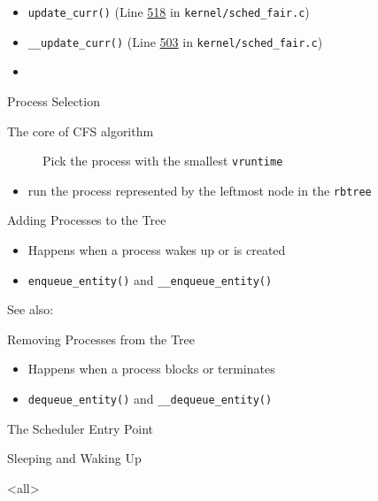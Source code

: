 \begin{itemize}
\item \texttt{update\_curr()} (Line
  \href{http://lxr.linux.no/linux+v2.6.34/kernel/sched\_fair.c\#L518}{518} in
  \texttt{kernel/sched\_fair.c}) 
\item \texttt{\_\_update\_curr()} (Line
  \href{http://lxr.linux.no/linux+v2.6.34/kernel/sched\_fair.c\#L503}{503} in
  \texttt{kernel/sched\_fair.c}) 
\item {}
\end{itemize}

\begin{frame}{Process Selection}
  \begin{description}
  \item[The core of CFS algorithm] Pick the process with the smallest \texttt{vruntime}
  \end{description}
  \begin{itemize}
  \item run the process represented by the leftmost node in the \texttt{rbtree}
  \end{itemize}
  \begin{center}
  \end{center}
\end{frame}

\begin{frame}{Adding Processes to the Tree}
  \begin{itemize}
  \item Happens when a process wakes up or is created
  \item \texttt{enqueue\_entity()} and \texttt{\_\_enqueue\_entity()}
  \end{itemize}
\end{frame}

See also: 

\begin{frame}{Removing Processes from the Tree}
  \begin{itemize}
  \item Happens when a process blocks or terminates
  \item \texttt{dequeue\_entity()} and \texttt{\_\_dequeue\_entity()}
  \end{itemize}
\end{frame}

\begin{frame}{The Scheduler Entry Point}
  
\end{frame}

\begin{frame}{Sleeping and Waking Up}
  
\end{frame}


\mode<all>
